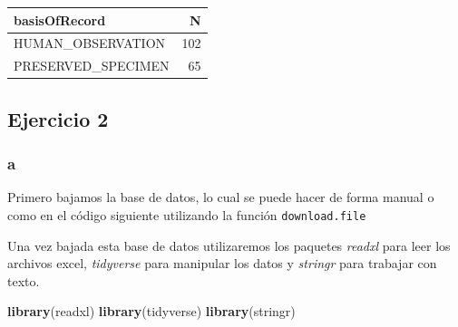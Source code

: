 \documentclass[]{book}
\newenvironment{Shaded}{\begin{snugshade}}{\end{snugshade}}
\newcommand{\DataTypeTok}[1]{\textcolor[rgb]{0.13,0.29,0.53}{#1}}
\newcommand{\KeywordTok}[1]{\textcolor[rgb]{0.13,0.29,0.53}{\textbf{#1}}}
\newcommand{\NormalTok}[1]{#1}
\newcommand{\OperatorTok}[1]{\textcolor[rgb]{0.81,0.36,0.00}{\textbf{#1}}}
\newcommand{\StringTok}[1]{\textcolor[rgb]{0.31,0.60,0.02}{#1}}
\begin{document}
\begin{Shaded}
\end{Shaded}

\begin{tabular}{l|r}
\hline
basisOfRecord & N\\
\hline
HUMAN\_OBSERVATION & 102\\
\hline
PRESERVED\_SPECIMEN & 65\\
\hline
\end{tabular}

\hypertarget{ejercicio-2-3}{%
\subsection{Ejercicio 2}\label{ejercicio-2-3}}

\hypertarget{a-1}{%
\subsubsection{a}\label{a-1}}

Primero bajamos la base de datos, lo cual se puede hacer de forma manual
o como en el código siguiente utilizando la función
\texttt{download.file}

\begin{Shaded}
\end{Shaded}

Una vez bajada esta base de datos utilizaremos los paquetes
\emph{readxl} para leer los archivos excel, \emph{tidyverse} para
manipular los datos y \emph{stringr} para trabajar con texto.

\begin{Shaded}
\begin{Highlighting}[]
\KeywordTok{library}\NormalTok{(readxl)}
\KeywordTok{library}\NormalTok{(tidyverse)}
\KeywordTok{library}\NormalTok{(stringr)}
\end{Highlighting}
\end{Shaded}
\end{document}
